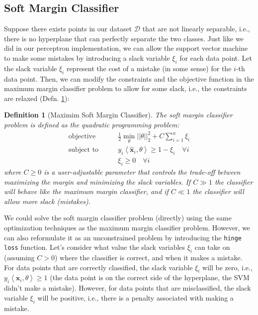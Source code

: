 \documentclass{article}[11pt]
\newtheorem{defn}{Definition}
\newcommand{\norm}[1]{\left|\left|#1\right|\right|}
\begin{document}
\subsection{Soft Margin Classifier}\label{sec:soft-margin}
Suppose there exists points in our dataset $\mathcal{D}$ that are not linearly separable, i.e., there is no hyperplane that can perfectly separate the two classes.
Just like we did in our perceptron implementation, we can allow the support vector machine to make some mistakes by introducing a slack variable $\xi_{i}$ for each data point.
Let the slack variable $\xi_{i}$ represent the cost of a mistake (in some sense) for the $i$-th data point.
Then, we can modify the constraints and the objective function in the maximum margin classifier problem to allow for some slack, i.e., the constraints are relaxed (Defn. \ref{defn:soft-margin}):
\begin{mdframed}
\begin{defn}[Maximim Soft Margin Classifier]\label{defn:soft-margin}
The soft margin classifier problem is defined as the quadratic programming problem:
\begin{align*}
    \text{objective}\qquad & \frac{1}{2}\min_{\theta}\norm{\theta}_{2}^{2} + C\sum_{i=1}^{n}\xi_{i}\\
    \text{subject to}\qquad & y_{i}\left<\hat{\mathbf{x}}_{i},\theta\right> \geq 1 - \xi_{i}\quad\forall i\\
    & \xi_{i} \geq 0\quad\forall i
\end{align*}
where $C\geq{0}$ is a user-adjustable parameter that controls the trade-off between maximizing the margin and minimizing the slack variables.
If $C\gg{1}$ the classifier will behave like the maximum margin classifier, and if $C\ll{1}$ the classifier will allow more slack (mistakes).
\end{defn}
\end{mdframed}
We could solve the soft margin classifier problem (directly) using the same optimization techniques as the maximum margin classifier problem.
However, we can also reformulate it as an unconstrained problem by introducing the \texttt{hinge loss} function. 
Let's consider what value the slack variables $\xi_{i}$ can take on (assuming $C>{0}$) where the classifier is correct, and when it makes a mistake.
For data points that are correctly classified, the slack variable $\xi_{i}$ will be zero, i.e., $y_{i}\left<\hat{\mathbf{x}}_{i},\theta\right> \geq 1$ 
(the data point is on the correct side of the hyperplane, the SVM didn't make a mistake). 
However, for data points that are misclassified, the slack variable $\xi_{i}$ will be positive, i.e., there is a penalty associated with making a mistake. 
\end{document}
